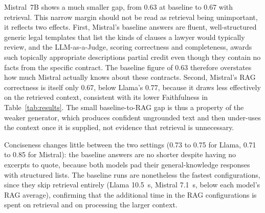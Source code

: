 Mistral~7B shows a much smaller gap, from 0.63 at baseline to 0.67 with retrieval. This narrow margin should not be read as retrieval being unimportant, it reflects two effects. First, Mistral's baseline answers are fluent, well-structured generic legal templates that list the kinds of clauses a lawyer would typically review, and the LLM-as-a-Judge, scoring correctness and completeness, awards such topically appropriate descriptions partial credit even though they contain no facts from the specific contract. The baseline figure of 0.63 therefore overstates how much Mistral actually knows about these contracts. Second, Mistral's RAG correctness is itself only 0.67, below Llama's 0.77, because it draws less effectively on the retrieved context, consistent with its lower Faithfulness in Table~\ref{tab:results}. The small baseline-to-RAG gap is thus a property of the weaker generator, which produces confident ungrounded text and then under-uses the context once it is supplied, not evidence that retrieval is unnecessary.

Conciseness changes little between the two settings (0.73 to 0.75 for Llama, 0.71 to 0.85 for Mistral): the baseline answers are no shorter despite having no excerpts to quote, because both models pad their general-knowledge responses with structured lists. The baseline runs are nonetheless the fastest configurations, since they skip retrieval entirely (Llama 10.5~s, Mistral 7.1~s, below each model's RAG average), confirming that the additional time in the RAG configurations is spent on retrieval and on processing the larger context.